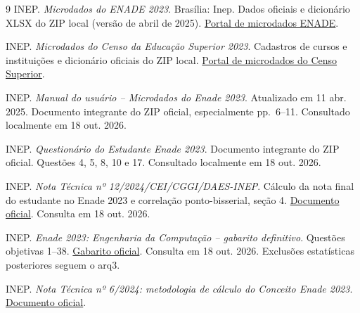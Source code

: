 \documentclass[12pt,a4paper]{article}
\begin{document}
\clearpage
\begin{thebibliography}{9}
 INEP. \textit{Microdados do ENADE 2023}. Brasília: Inep.
Dados oficiais e dicionário XLSX do ZIP local (versão de abril de 2025).
\href{https://www.gov.br/inep/pt-br/acesso-a-informacao/dados-abertos/microdados/enade}{Portal de microdados ENADE}.

 INEP. \textit{Microdados do Censo da Educação Superior 2023}.
Cadastros de cursos e instituições e dicionário oficiais do ZIP local.
\href{https://www.gov.br/inep/pt-br/acesso-a-informacao/dados-abertos/microdados/censo-da-educacao-superior}{Portal de microdados do Censo Superior}.

 INEP. \textit{Manual do usuário -- Microdados do Enade 2023}.
Atualizado em 11 abr. 2025. Documento integrante do ZIP oficial, especialmente
pp.~6--11. Consultado localmente em 18 out. 2026.

 INEP. \textit{Questionário do Estudante Enade 2023}.
Documento integrante do ZIP oficial. Questões 4, 5, 8, 10 e 17.
Consultado localmente em 18 out. 2026.

 INEP. \textit{Nota Técnica nº 12/2024/CEI/CGGI/DAES-INEP}.
Cálculo da nota final do estudante no Enade 2023 e correlação ponto-bisserial,
seção 4.
\href{https://download.inep.gov.br/educacao_superior/enade/notas_tecnicas/2024/nota_tecnica_12_calculo_nota_final_enade_2023.pdf}{Documento oficial}.
Consulta em 18 out. 2026.

 INEP. \textit{Enade 2023: Engenharia da Computação --
gabarito definitivo}. Questões objetivas 1--38.
\href{https://download.inep.gov.br/enade/provas_e_gabaritos/2023_GB_engenharia_da_computacao.pdf}{Gabarito oficial}.
Consulta em 18 out. 2026. Exclusões estatísticas posteriores seguem o arq3.

 INEP. \textit{Nota Técnica nº 6/2024: metodologia de
cálculo do Conceito Enade 2023}.
\href{https://download.inep.gov.br/educacao_superior/enade/notas_tecnicas/2024/nota_tecnica_6_metodologia_calculo_conceito_enade_2023.pdf}{Documento oficial}.
\end{thebibliography}
\end{document}
